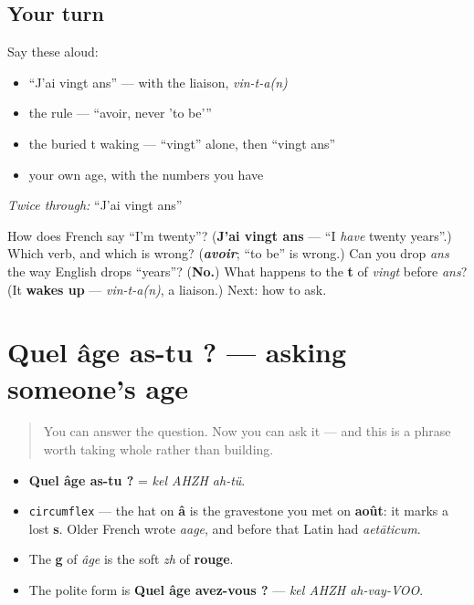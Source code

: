\subsection*{Your turn}
Say these aloud:

\begin{itemize}
\raggedright
  \item \textquotedblleft{}J'ai vingt ans\textquotedblright{} — with the liaison, \emph{vin-t-a(n)}
  \item the rule — \textquotedblleft{}avoir, never 'to be'\textquotedblright{}
  \item the buried t waking — \textquotedblleft{}vingt\textquotedblright{} alone, then \textquotedblleft{}vingt ans\textquotedblright{}
  \item your own age, with the numbers you have
\end{itemize}

\emph{Twice through:} \textquotedblleft{}J'ai vingt ans\textquotedblright{}

\begin{tcolorbox}[breakable,colback=teal!4,colframe=teal!35!black,title={Before you move on}]
How does French say \textquotedblleft{}I'm twenty\textquotedblright{}? (\textbf{J'ai vingt ans} — \textquotedblleft{}I \emph{have} twenty years\textquotedblright{}.) Which verb, and which is wrong? (\emph{\textbf{avoir}}; \textquotedblleft{}to be\textquotedblright{} is wrong.) Can you drop \emph{ans} the way English drops \textquotedblleft{}years\textquotedblright{}? (\textbf{No.}) What happens to the \textbf{t} of \emph{vingt} before \emph{ans}? (It \textbf{wakes up} — \emph{vin-t-a(n)}, a liaison.) Next: how to ask.
\end{tcolorbox}
\section[Quel âge as-tu ?]{Quel âge as-tu ? — asking someone's age}

\label{lesson:FR-C14-quel-age}



\begin{quote}
You can answer the question. Now you can ask it — and this is a phrase worth taking whole rather than building.
\end{quote}

\begin{sounds}
\begin{itemize}
\raggedright
  \item \textbf{Quel âge as-tu ?} = \emph{kel AHZH ah-tü}.
  \item \texttt{circumflex} — the hat on \textbf{â} is the gravestone you met on \textbf{août}: it marks a lost \textbf{s}. Older French wrote \emph{aage}, and before that Latin had \emph{aetāticum}.
  \item The \textbf{g} of \emph{âge} is the soft \emph{zh} of \textbf{rouge}.
  \item The polite form is \textbf{Quel âge avez-vous ?} — \emph{kel AHZH ah-vay-VOO}.
\end{itemize}
\end{sounds}

